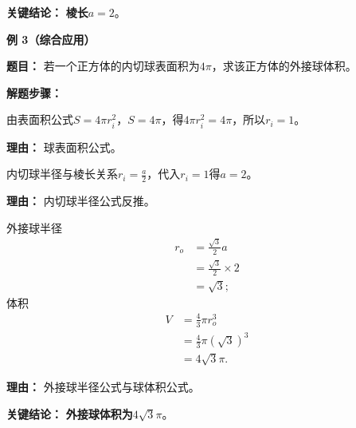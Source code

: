 \begin{examplebox}
	\textbf{\textcolor{CExample}{关键结论：}}
	\textbf{棱长$a=2$}。

	\medskip
	\textbf{\textcolor{CExample}{例 3（综合应用）}}

	\textbf{\textcolor{CExample}{题目：}}
	若一个正方体的内切球表面积为$4\pi$，求该正方体的外接球体积。

	\textbf{\textcolor{CExample}{解题步骤：}}
	\begin{description}[style=nextline, leftmargin=2.8em, labelsep=0.5em, itemsep=0.45em]
		\item[\textbf{第一步（求内切球半径）：}] 由表面积公式$S=4\pi r_i^2$，$S=4\pi$，得$4\pi r_i^2=4\pi$，所以$r_i=1$。
			\par\textbf{理由：}
			球表面积公式。
		\item[\textbf{第二步（求棱长）：}] 内切球半径与棱长关系$r_i = \frac{a}{2}$，代入$r_i=1$得$a=2$。
			\par\textbf{理由：}
			内切球半径公式反推。
		\item[\textbf{第三步（求外接球半径与体积）：}] 外接球半径
			\[
				\begin{aligned}
					r_o &= \frac{\sqrt{3}}{2}a \\
					&= \frac{\sqrt{3}}{2}\times2 \\
					&= \sqrt{3};
			\end{aligned}
			\]
			体积
			\[
				\begin{aligned}
					V &= \frac{4}{3}\pi r_o^3 \\
					&= \frac{4}{3}\pi (\sqrt{3})^3 \\
					&= 4\sqrt{3}\pi.
			\end{aligned}
			\]
			\par\textbf{理由：}
			外接球半径公式与球体积公式。
	\end{description}

	\textbf{\textcolor{CExample}{关键结论：}}
	\textbf{外接球体积为$4\sqrt{3}\pi$}。

\end{examplebox}
